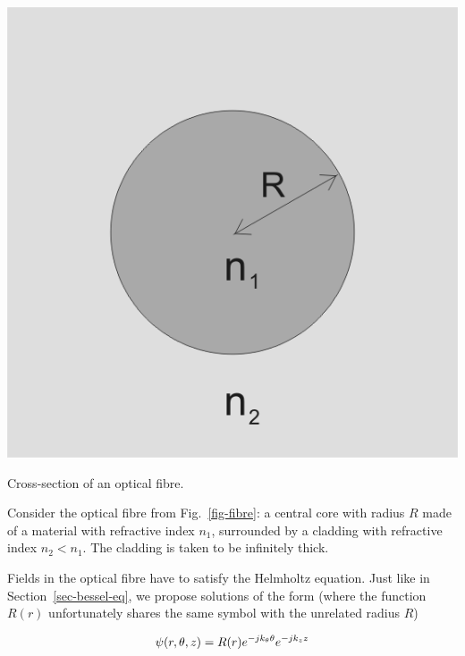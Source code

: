\pagebreak




\begin{marginfigure}[3cm]
\centering
\includegraphics{bessel/figures/fibre}
\caption{Cross-section of an optical fibre.}
\label{fig-fibre}
\end{marginfigure}

\noindent{}Consider the optical fibre from Fig.~\ref{fig-fibre}: a central core with radius $R$ made of a material with refractive index $n_1$, surrounded by a cladding with refractive index $n_2 < n_1$. The cladding is taken to be infinitely thick. 

Fields in the optical fibre have to satisfy the Helmholtz equation. Just like in Section~\ref{sec-bessel-eq}, we propose solutions of the form (where the function $R(r)$ unfortunately shares the same symbol with the unrelated radius $R$)

\begin{equation}
\psi(r,\theta,z) = R(r)e^{-j k_\theta \theta }e^{-j k_z z} \\
\end{equation}

